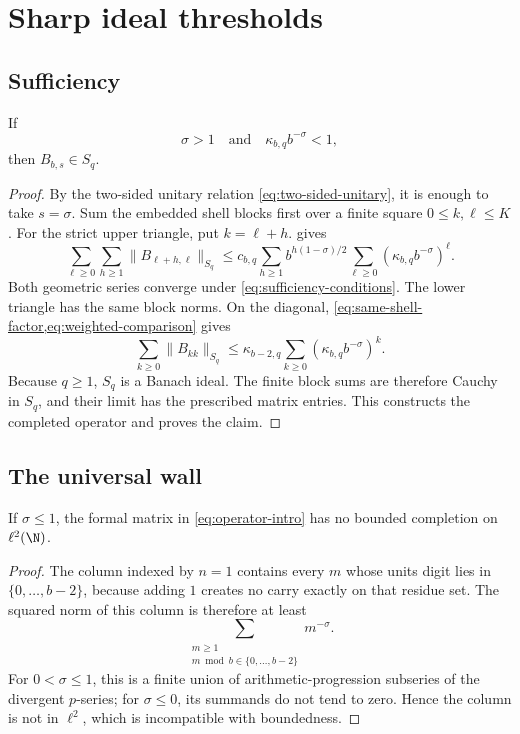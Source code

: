 \section{Sharp ideal thresholds}
\label{sec:thresholds}

\subsection{Sufficiency}

\begin{proposition}
\label{prop:sufficiency}
If
\begin{equation}
  \sigma>1
  \quad\text{and}\quad
  \kappa_{b,q}b^{-\sigma}<1,
  \label{eq:sufficiency-conditions}
\end{equation}
then \(B_{b,s}\in S_q\).
\end{proposition}

\begin{proof}
By the two-sided unitary relation \cref{eq:two-sided-unitary}, it is enough
to take \(s=\sigma\).  Sum the embedded shell blocks first over a finite
square \(0\le k,\ell\le K\).  For the strict upper triangle, put
\(k=\ell+h\).   gives
\[
  \sum_{\ell\ge0}\sum_{h\ge1}
  \|B_{\ell+h,\ell}\|_{S_q}
  \le
  c_{b,q}
  \sum_{h\ge1}b^{h(1-\sigma)/2}
  \sum_{\ell\ge0}
  (\kappa_{b,q}b^{-\sigma})^\ell.
\]
Both geometric series converge under
\cref{eq:sufficiency-conditions}.  The lower triangle has the same block
norms.  On the diagonal,
\cref{eq:same-shell-factor,eq:weighted-comparison} gives
\[
  \sum_{k\ge0}\|B_{kk}\|_{S_q}
  \le
  \kappa_{b-2,q}
  \sum_{k\ge0}
  (\kappa_{b,q}b^{-\sigma})^k.
\]
Because \(q\ge1\), \(S_q\) is a Banach ideal.  The finite block sums are
therefore Cauchy in \(S_q\), and their limit has the prescribed matrix
entries.  This constructs the completed operator and proves the claim.
\end{proof}

\subsection{The universal wall}

\begin{proposition}
\label{prop:column-wall}
If \(\sigma\le1\), the formal matrix in \cref{eq:operator-intro} has no
bounded completion on \(\ell^2(\N)\).
\end{proposition}

\begin{proof}
The column indexed by \(n=1\) contains every \(m\) whose units digit lies
in \(\{0,\ldots,b-2\}\), because adding \(1\) creates no carry exactly on
that residue set.  The squared norm of this column is therefore at least
\[
  \sum_{\substack{m\ge1\\m\bmod b\in\{0,\ldots,b-2\}}}m^{-\sigma}.
\]
For \(0<\sigma\le1\), this is a finite union of arithmetic-progression
subseries of the divergent \(p\)-series; for \(\sigma\le0\), its summands
do not tend to zero.  Hence the column is not in \(\ell^2\), which is
incompatible with boundedness.
\end{proof}

